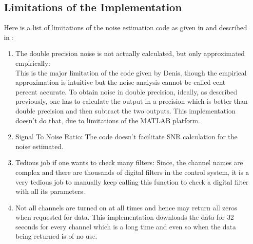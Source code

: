 \documentclass[colorlinks=true,pdfstartview=FitV,linkcolor=blue,
            citecolor=red,urlcolor=magenta]{ligodoc}
\begin{document}
	\subsection{Limitations of the Implementation}
	Here is a list of limitations of the noise estimation code as given in \cite{dencode} and described in \cite{thesis}:
		\begin{enumerate}
			\item The double precision noise is not actually calculated, but only approximated empirically: \\
				This is the major limitation of the code given by Denis, though the empirical approximation is intuitive but the noise analysis cannot be called cent percent accurate. To obtain noise in double precision, ideally, as described previously, one has to calculate the output in a precision which is better than double precision and then subtract the two outputs. This implementation doesn't do that, due to limitations of the MATLAB platform.
				
			\item Signal To Noise Ratio: The code \cite{dencode} doesn't facilitate SNR calculation for the noise estimated. 
			\item Tedious job if one wants to check many filters: Since, the channel names are complex and there are thousands of digital filters in the control system, it is a very tedious job to manually keep calling this function to check a digital filter with all its parameters. 
			\item Not all channels are turned on at all times and hence may return all zeros when requested for data. This implementation downloads the data for 32 seconds for every channel which is a long time and even so when the data being returned is of no use. 
	\end{enumerate}
\end{document}

